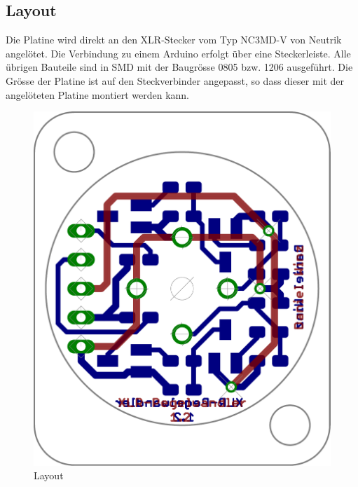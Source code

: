 \subsection{Layout}
Die Platine wird direkt an den XLR-Stecker vom Typ NC3MD-V von Neutrik angelötet. Die Verbindung zu einem Arduino erfolgt über eine Steckerleiste. Alle übrigen Bauteile sind in SMD mit der Baugrösse 0805 bzw. 1206 ausgeführt. Die Grösse der Platine ist auf den Steckverbinder angepasst, so dass dieser mit der angelöteten Platine montiert werden kann. 
\begin{figure}[h!]
	\centering
	\includegraphics[scale=\layscale]{fig/xlr_pegelwandler_v_1_2_lay_transp.pdf}
	\caption{Layout}
	\label{lay:pegw}
\end{figure}

